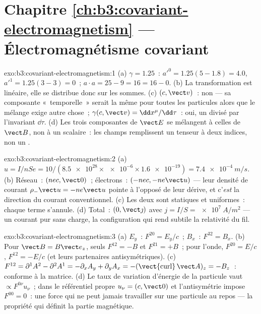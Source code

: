 \section*{Chapitre \ref{ch:b3:covariant-electromagnetism} --- Électromagnétisme covariant}

\begin{solution}{exo:b3:covariant-electromagnetism:1}
(a) $\gamma = 1.25$~: $a'^0 = 1.25(5 - 1.8) = 4.0$, $a'^1 = 1.25(3 -
3) = 0$~; $a\cdot a = 25 - 9 = 16 = 16 - 0$. (b) La transformation est
linéaire, elle se distribue donc sur les sommes. (c) $(c, \vect v)$~:
non --- sa composante «~temporelle~» serait la même pour toutes les
particules alors que le mélange exige autre chose~;
$\gamma(c, \vect v) = \dd x^\mu/\dd\tau$~: oui, un  divisé
par l'invariant $\dd\tau$. (d) Les trois composantes de $\vect E$ se
mélangent à celles de $\vect B$, non à un scalaire~: les champs
remplissent un tenseur à deux indices, non un .
\end{solution}

\begin{solution}{exo:b3:covariant-electromagnetism:2}
(a) $u = I/nSe = 10/(\num{8.5e28} \times \num{e-6} \times
\num{1.6e-19}) = \qty{7.4e-4}{m/s}$. (b) Réseau~: $(nec, \vect 0)$~;
électrons~: $(-nec, -ne\vect u)$ --- leur densité de courant
$\rho_-\vect u = -ne\vect u$ pointe à l'opposé de leur dérive, et
c'\emph{est} la direction du courant conventionnel. (c) Les deux sont
statiques et uniformes~: chaque terme s'annule. (d) Total~:
$(0, \vect\jmath)$ avec $j = I/S = \qty{e7}{A/m^2}$ --- un courant pur
sans charge, la configuration qui rend subtile la relativité du fil.
\end{solution}

\begin{solution}{exo:b3:covariant-electromagnetism:3}
(a) $E_y$~: $F^{20} = E_y/c$~; $B_x$~: $F^{32} = B_x$. (b) Pour $\vect B
= B\vect e_z$, seuls $F^{12} = -B$ et $F^{21} = +B$~; pour l'onde,
$F^{20} = E/c$, $F^{12} = -E/c$ (et leurs partenaires antisymétriques). (c)
$F^{12} = \partial^1A^2 - \partial^2A^1 = -\partial_xA_y +
\partial_yA_x = -(\operatorname{\vect{curl}}\vect A)_z = -B_z$~:
conforme à la matrice. (d) Le taux de variation d'énergie de la
particule vaut $\propto F^{0\nu}u_\nu$~; dans le référentiel propre
$u_\nu = (c, \vect 0)$ et l'antisymétrie impose $F^{00} = 0$~: une
force qui ne peut jamais travailler sur une particule au repos --- la
propriété qui définit la partie magnétique.
\end{solution}

